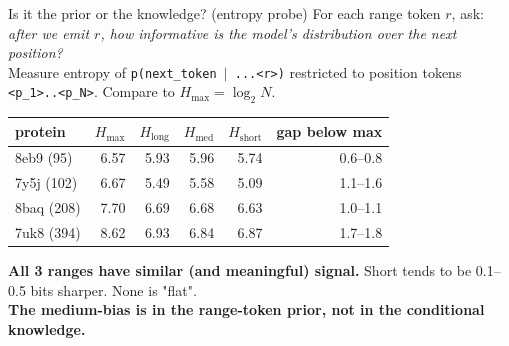 \documentclass[aspectratio=169,11pt]{beamer}
\newcommand{\codeS}[1]{\texttt{\scriptsize\color{navy}#1}}
\begin{document}
\begin{frame}{Is it the prior or the knowledge? (entropy probe)}
  For each range token $r$, ask: \emph{after we emit $r$, how
  informative is the model's distribution over the next position?}\\[0.3em]
  Measure entropy of \codeS{p(next\_token $\mid$ ...<r>)} restricted to position
  tokens \codeS{<p\_1>..<p\_N>}. Compare to $H_{\max} = \log_2 N$.
  \vspace{0.3em}
  \begin{center}
    \begin{tabular}{lrrrrr}
      \toprule
      protein & $H_{\max}$ & $H_{\text{long}}$ & $H_{\text{med}}$ &
        $H_{\text{short}}$ & gap below max \\
      \midrule
      8eb9 (95)   & 6.57 & 5.93 & 5.96 & 5.74 & 0.6--0.8 \\
      7y5j (102)  & 6.67 & 5.49 & 5.58 & 5.09 & 1.1--1.6 \\
      8baq (208)  & 7.70 & 6.69 & 6.68 & 6.63 & 1.0--1.1 \\
      7uk8 (394)  & 8.62 & 6.93 & 6.84 & 6.87 & 1.7--1.8 \\
      \bottomrule
    \end{tabular}
  \end{center}
  \vspace{0.3em}
  \textbf{All 3 ranges have similar (and meaningful) signal.}
  Short tends to be 0.1--0.5 bits sharper. None is "flat".\\[0.3em]
  \textbf{The medium-bias is in the range-token prior, not in the
  conditional knowledge.}
\end{frame}
\end{document}
